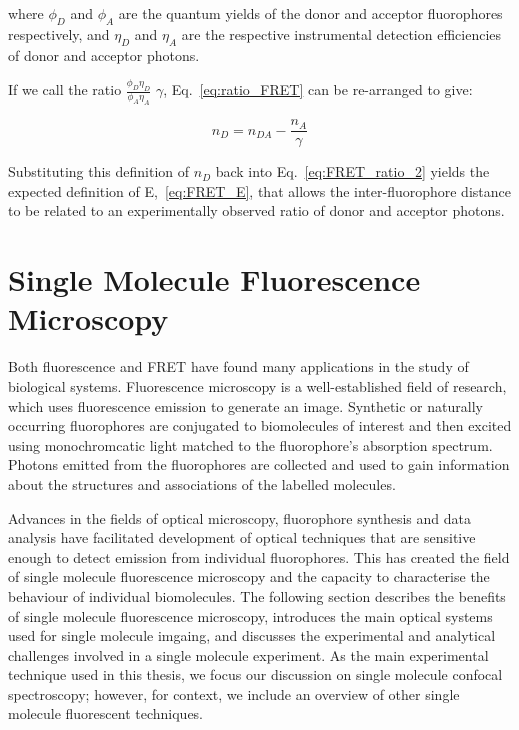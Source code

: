 where $\phi_D$ and $\phi_A$ are the quantum yields of the donor and acceptor fluorophores respectively, and $\eta_D$ and $\eta_A$ are the respective instrumental detection efficiencies of donor and acceptor photons.

If we call the ratio $\frac{\phi_D\eta_D}{\phi_A\eta_A}$ $\gamma$, Eq.~\ref{eq:ratio_FRET} can be re-arranged to give:

\begin{equation}
n_D = n_{DA} - \frac{n_A}{\gamma}
\label{eq:get_gamma}
\end{equation}

Substituting this definition of $n_D$ back into Eq.~\ref{eq:FRET_ratio_2} yields the expected definition of E,~\ref{eq:FRET_E}, that allows the inter-fluorophore distance to be related to an experimentally observed ratio of donor and acceptor photons.

\section{Single Molecule Fluorescence Microscopy}
Both fluorescence and FRET have found many applications in the study of biological systems. Fluorescence microscopy is a well-established field of research, which uses fluorescence emission to generate an image. Synthetic or naturally occurring fluorophores are conjugated to biomolecules of interest and then excited using monochromcatic light matched to the fluorophore's absorption spectrum. Photons emitted from the fluorophores are collected and used to gain information about the structures and associations of the labelled molecules. 

Advances in the fields of optical microscopy, fluorophore synthesis and data analysis have facilitated development of optical techniques that are sensitive enough to detect emission from individual fluorophores. This has created the field of single molecule fluorescence microscopy and the capacity to characterise the behaviour of individual biomolecules. The following section describes the benefits of single molecule fluorescence microscopy, introduces the main optical systems used for single molecule imgaing, and discusses the experimental and analytical challenges involved in a single molecule experiment. As the main experimental technique used in this thesis, we focus our discussion on single molecule confocal spectroscopy; however, for context, we include an overview of other single molecule fluorescent techniques.  

